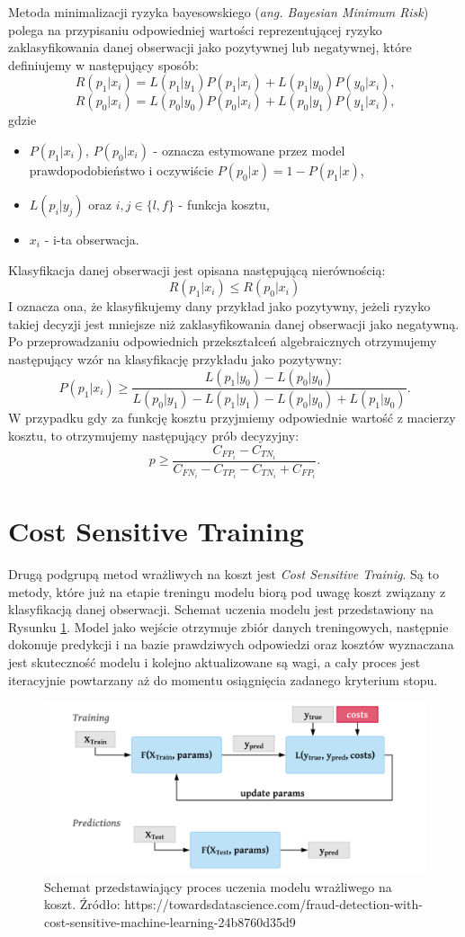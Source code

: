 \documentclass[inzynierska]{pwr_wmat_praca_dyplomowa}
\theoremstyle{plain}
\numberwithin{theorem}{chapter}
\theoremstyle{definition}
\numberwithin{theorem}{chapter}
\begin{document}
Metoda minimalizacji ryzyka bayesowskiego (\textit{ang. Bayesian Minimum Risk}) polega na przypisaniu odpowiedniej wartości reprezentującej ryzyko zaklasyfikowania danej obserwacji jako pozytywnej lub negatywnej, które definiujemy w następujący sposób:
$$ R(p_1|x_i) = L(p_1|y_1)P(p_1|x_i) + L(p_1|y_0)P(y_0|x_i) \text{,}$$
$$ R(p_0|x_i) = L(p_0|y_0)P(p_0|x_i) + L(p_0|y_1)P(y_1|x_i) \text{,}$$
gdzie
\begin{itemize}
	\item $P(p_1|x_i)$, $P(p_0|x_i)$ - oznacza estymowane przez model prawdopodobieństwo i oczywiście $P(p_0|x) = 1 - P(p_1|x)$,
	\item $L(p_{i}|y_{j})$ oraz $i,j \in \{l,f\}$ - funkcja kosztu,
	\item $x_i$ - i-ta obserwacja.
\end{itemize}{}
Klasyfikacja danej obserwacji jest opisana następującą nierównością:
$$ R(p_1|x_i) \leq R(p_0|x_i)$$
I oznacza ona, że klasyfikujemy dany przykład jako pozytywny, jeżeli ryzyko takiej decyzji jest mniejsze niż zaklasyfikowania danej obserwacji jako negatywną. 
Po przeprowadzaniu odpowiednich przekształceń algebraicznych otrzymujemy następujący wzór na klasyfikację przykładu jako pozytywny:
$$ P(p_1|x_i) \ge \frac{L(p_1|y_0) - L(p_0|y_0)}{L(p_0|y_1) - L(p_1|y_1) - L(p_0|y_0) + L(p_1|y_0)} \text{.}$$
W przypadku gdy za funkcję kosztu przyjmiemy odpowiednie wartość z macierzy kosztu, to otrzymujemy następujący prób decyzyjny:
$$ p \ge \frac{C_{FP_i} - C_{TN_i}}{C_{FN_i} - C_{TP_i} - C_{TN_i} + C_{FP_i}} \text{.}$$

\section{Cost Sensitive Training}
Drugą podgrupą metod wrażliwych na koszt jest \textit{Cost Sensitive Trainig}. Są to metody, które już na etapie treningu modelu biorą pod uwagę koszt związany z klasyfikacją danej obserwacji. Schemat uczenia modelu jest przedstawiony na Rysunku \ref{cst}. Model jako wejście otrzymuje zbiór danych treningowych, następnie dokonuje predykcji i na bazie prawdziwych odpowiedzi oraz kosztów wyznaczana jest skuteczność modelu i kolejno aktualizowane są wagi, a cały proces jest iteracyjnie powtarzany aż do momentu osiągnięcia zadanego kryterium stopu.
\begin{figure}
	\includegraphics[width=\linewidth]{images/cost_sensitive_training.png}
	\caption{Schemat przedstawiający proces uczenia modelu wrażliwego na koszt. Źródło: https://towardsdatascience.com/fraud-detection-with-cost-sensitive-machine-learning-24b8760d35d9}
	\label{cst}
\end{figure}	
\end{document}
